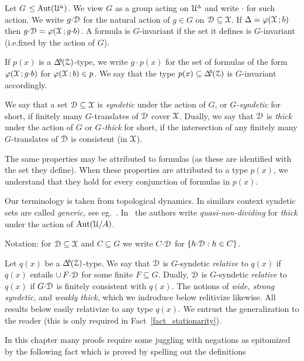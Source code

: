Let \emph{$G$\/} $\le{\rm Aut}(\EuScript U\kern-.2ex^{\scriptscriptstyle\Delta})$.
We view $G$ as a group acting on $\EuScript U\kern-.2ex^{\scriptscriptstyle\Delta}$ and write ${\cdot}$ for such action.
We write $g{\cdot}\EuScript D$ for the natural action of $g\in G$ on $\EuScript D\subseteq\EuScript X$.
If $\Delta=\varphi(\EuScript X\,;b)$ then $g{\cdot}\EuScript D=\varphi(\EuScript X\,;g{\cdot}b)$.
A formula is $G$-invariant if the set it defines is $G$-invariant (i.e.\@ fixed by the action of $G$).

If $p(x)$ is a $\BDelta(\Z)$-type, we write $g{\cdot}p(x)$ for the set of formulas of the form $\varphi(\EuScript X\,;g{\cdot}b)$ for $\varphi(\EuScript X\,;b)\in p$.
We say that the type $p(x)\subseteq\BDelta(\Z)$ is $G$-invariant accordingly.

We say that a set $\EuScript D\subseteq\EuScript X$ is \emph{syndetic\/} under the action of $G$, or \emph{$G$-syndetic\/} for short, if finitely many $G$-translates of $\EuScript D$ cover $\EuScript X$.
Dually, we say that $\EuScript D$ is \emph{thick\/} under the action of $G$ or \emph{$G$-thick\/} for short, if the intersection of any finitely many $G$-translates of $\EuScript D$ is consistent (in $\EuScript X$).

The same properties may be attributed to formulas (as these are identified with the set they define).
When these properties are attributed to a type $p(x)$, we understand that they hold for every conjunction of formulas in $p(x)$.

Our terminology is taken from topological dynamics.
In similars context syndetic sets are called \textit{generic,} see eg.~\cite{Ne}.
In~\cite{CK} the authors write \textit{quasi-non-dividing\/} for \textit{thick\/} under the action of ${\rm Aut}(\EuScript U/A)$.

Notation: for $\EuScript D\subseteq\EuScript X$ and $C\subseteq G$ we write \emph{$C{\cdot}\EuScript D$\/} for $\{h{\cdot}\EuScript D: h\in C\}$.

\begin{remark}\label{rem_relative}
Let $q(x)$ be a $\BDelta(\Z)$-type.
We say that $\EuScript D$ is $G$-syndetic \emph{relative\/} to $q(x)$ if $q(x)$ entails $\cup\,F{\cdot}\EuScript D$ for some finite $F\subseteq G$.
Dually, $\EuScript D$ is $G$-syndetic \emph{relative\/} to $q(x)$ if $G{\cdot}\EuScript D$ is finitely consistent with $q(x)$.
The notions of \textit{wide,\/} \textit{strong syndetic,\/} and \textit{weakly thick,\/}  which we indroduce below relitivize likewise.
All results below easily relativize to any type $q(x)$.
We entrust the generalization to the reader (this is only required in Fact~\ref{fact_stationarity}).
\end{remark}

In this chapter many proofs require some juggling with negations as epitomized by the following fact which is proved by spelling out the definitions

